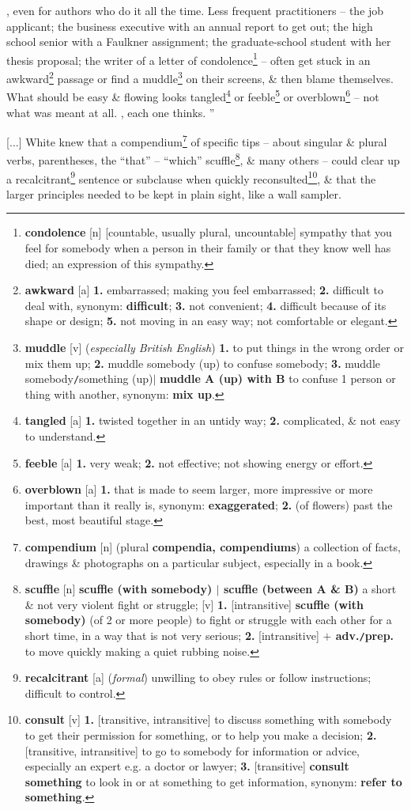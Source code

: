 \documentclass{article}
\begin{document}
, even for authors who do it all the time. Less frequent practitioners -- the job applicant; the business executive with an annual report to get out; the high school senior with a Faulkner assignment; the graduate-school student with her thesis proposal; the writer of a letter of condolence\footnote{{\bf condolence} [n] [countable, usually plural, uncountable] sympathy that you feel for somebody when a person in their family or that they know well has died; an expression of this sympathy.} -- often get stuck in an awkward\footnote{{\bf awkward} [a] {\bf 1.} embarrassed; making you feel embarrassed; {\bf 2.} difficult to deal with, {\sc synonym}: {\bf difficult}; {\bf 3.} not convenient; {\bf 4.} difficult because of its shape or design; {\bf 5.} not moving in an easy way; not comfortable or elegant.} passage or find a muddle\footnote{{\bf muddle} [v] ({\it especially British English}) {\bf 1.} to put things in the wrong order or mix them up; {\bf 2.} muddle somebody (up) to confuse somebody; {\bf 3.} muddle somebody{\tt/}something (up)$|$ {\bf muddle A (up) with B} to confuse 1 person or thing with another, {\sc synonym}: {\bf mix up}.} on their screens, \& then blame themselves. What should be easy \& flowing looks tangled\footnote{{\bf tangled} [a] {\bf 1.} twisted together in an untidy way; {\bf 2.} complicated, \& not easy to understand.} or feeble\footnote{{\bf feeble} [a] {\bf 1.} very weak; {\bf 2.} not effective; not showing energy or effort.} or overblown\footnote{{\bf overblown} [a] {\bf 1.} that is made to seem larger, more impressive or more important than it really is, {\sc synonym}: {\bf exaggerated}; {\bf 2.} (of flowers) past the best, most beautiful stage.} -- not what was meant at all. , each one thinks. ''

[$\ldots$] White knew that a compendium\footnote{{\bf compendium} [n] (plural {\bf compendia, compendiums}) a collection of facts, drawings \& photographs on a particular subject, especially in a book.} of specific tips -- about singular \& plural verbs, parentheses, the ``that'' -- ``which'' scuffle\footnote{{\bf scuffle} [n] {\bf scuffle (with somebody) $|$ scuffle (between A \& B)} a short \& not very violent fight or struggle; [v] {\bf 1.} [intransitive] {\bf scuffle (with somebody)} (of 2 or more people) to fight or struggle with each other for a short time, in a way that is not very serious; {\bf 2.} [intransitive] {\bf $+$ adv.{\tt/}prep.} to move quickly making a quiet rubbing noise.}, \& many others -- could clear up a recalcitrant\footnote{{\bf recalcitrant} [a] ({\it formal}) unwilling to obey rules or follow instructions; difficult to control.} sentence or subclause when quickly reconsulted\footnote{{\bf consult} [v] {\bf 1.} [transitive, intransitive] to discuss something with somebody to get their permission for something, or to help you make a decision; {\bf 2.} [transitive, intransitive] to go to somebody for information or advice, especially an expert e.g. a doctor or lawyer; {\bf 3.} [transitive] {\bf consult something} to look in or at something to get information, {\sc synonym}: {\bf refer to something}.}, \& that the larger principles needed to be kept in plain sight, like a wall sampler.
\end{document}
